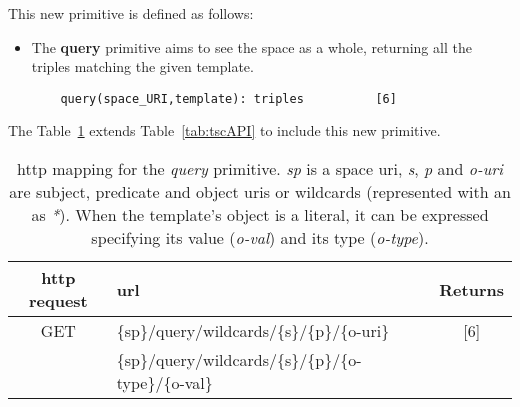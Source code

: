 This new primitive is defined as follows:
\begin{itemize}
  \item The \textbf{query} primitive aims to see the space as a whole, returning all the triples matching the given template.
  
  \begin{lstlisting}
    query(space_URI,template): triples          [6]
  \end{lstlisting}
\end{itemize}


The Table~\ref{tab:queryAPI} extends Table~\ref{tab:tscAPI} to include this new primitive.

\begin{table} %
  \centering
  \caption {
    \acs{http} mapping for the \emph{query} primitive.
    \textit{sp} is a space \acs{uri}, \textit{s}, \textit{p} and \textit{o-uri} are subject, predicate and object \acsp{uri} or wildcards (represented with an as \textit{*}).
    When the template's object is a literal, it can be expressed specifying its value (\textit{o-val}) and its type (\textit{o-type}).
    \medskip
  }
  \begin{tabular}{c|l|c}
      \acs{http} request & \acs{url} & Returns \\
      \hline
      GET & \{sp\}/query/wildcards/\{s\}/\{p\}/\{o-uri\} &  [6] \\
      & \{sp\}/query/wildcards/\{s\}/\{p\}/\{o-type\}/\{o-val\} & \\
  \end{tabular}
  \label{tab:queryAPI}
\end{table}


